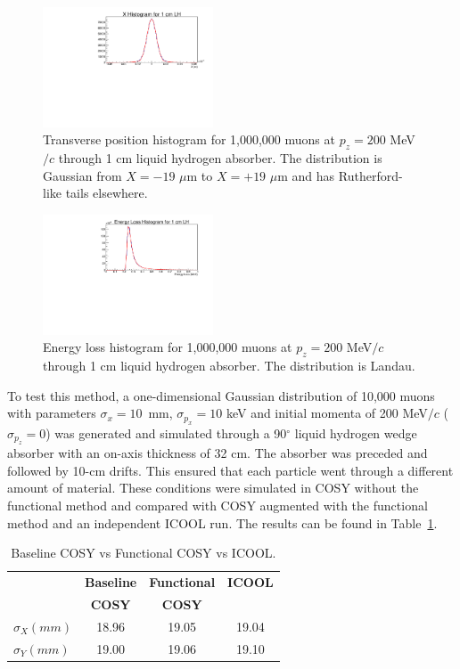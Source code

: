 \documentclass{jacow}
\begin{document}
\begin{figure}[htf]
\centering
\includegraphics[width=0.45\textwidth]{figures/scattering_curve.pdf}
\caption{Transverse position histogram for 1,000,000 muons at $p_z = 200$ MeV$/c$ through 1 cm liquid hydrogen absorber. The distribution is Gaussian from $X=-19$ $\mu$m to $X =+19$ $\mu$m and has Rutherford-like tails elsewhere.}
\label{fig:scattering_curve}
\end{figure}

\begin{figure}[htf]
\centering
\includegraphics[width=0.45\textwidth]{figures/straggling_curve.pdf}
\caption{Energy loss histogram for 1,000,000 muons at $p_z = 200$ MeV$/c$ through 1 cm liquid hydrogen absorber. The distribution is Landau.}
\label{fig:straggling_curve}
\end{figure}

To test this method, a one-dimensional Gaussian distribution of 10,000 muons with parameters $\sigma_x=10$~mm, $\sigma_{p_x}=10$ keV and initial momenta of 200 MeV$/c$ ($\sigma_{p_z} = 0$) was generated and simulated through a 90$^\circ$ liquid hydrogen wedge absorber with an on-axis thickness of 32 cm. The absorber was preceded and followed by 10-cm drifts. This ensured that each particle went through a different amount of material. These conditions were simulated in COSY without the functional method and compared with COSY augmented with the functional method and an independent ICOOL run. The results can be found in Table~\ref{tab:comparison}.

\begin{table}[hbt]
   \centering
   \caption{Baseline COSY vs Functional COSY vs ICOOL.}
   \begin{tabular}{lccc}
       \toprule
	\textbf{}& \textbf{Baseline} & \textbf{Functional}& \textbf{ICOOL} \\ 
	\textbf{}& \textbf{COSY} & \textbf{COSY}& \textbf{} \\ 
          $ \sigma_X (mm)$&18.96&19.05&19.04\\
	$\sigma_Y (mm)$&19.00&19.06&19.10\\
	\bottomrule
   \end{tabular}
   \label{tab:comparison}
\end{table}
\end{document}
